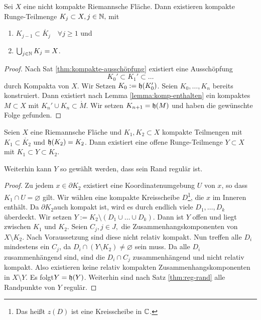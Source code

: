 \begin{cor}
  \label{cor:ausschöpfung-kompakt}
  Sei $X$ eine nicht kompakte Riemannsche Fläche. Dann existieren
  kompakte Runge-Teilmenge $K_j \subset X, j \in \mathbb{N},$ mit
  \begin{enumerate}
  \item $K_{j-1} \subset \mathring{K_j} \quad \forall j \geq 1$ und
  \item $\bigcup_{j\in \mathbb{N}} K_j = X$.
  \end{enumerate}
\end{cor}

\begin{proof}
  Nach Sat \ref{thm:kompakte-ausschöpfung} existiert eine 
  Ausschöpfung
  \[
  K_0' \subset K_1' \subset \dots
  \]
  durch Kompakta von $X$. Wir Setzen $K_0 := \mathfrak{h}(K_0')$. Seien
  $K_0, \dots, K_n$ bereits konstruiert. Dann existiert nach Lemma
  \ref{lemma:komp-enthalten} ein
  kompaktes $M \subset X$ mit $K_n' \cup K_n \subset \mathring
  M$. Wir setzen $K_{n+1} = \mathfrak{h}(M)$ und haben die gewünschte Folge
  gefunden.
\end{proof}

\begin{lemma}
  \label{lemma:zwischen-runge}
  Seien $X$ eine Riemannsche Fläche und $K_1, K_2 \subset X$ kompakte
  Teilmengen mit $K_1 \subset \mathring{K_2}$ und $\mathfrak{h}(K_2) =
  K_2$. Dann existiert eine offene Runge-Teilmenge $Y \subset X$ mit
  $K_1 \subset Y \subset K_2$.

  Weiterhin kann $Y$ so gewählt werden, dass sein Rand regulär ist.
\end{lemma}

\begin{proof}
  Zu jedem $x \in \partial K_2$ existiert eine Koordinatenumgebung $U$
  von $x$, so dass $K_1 \cap U = \varnothing$ gilt. Wir wählen eine kompakte
  Kreisscheibe $D$\footnote{Das heißt $z(D)$ ist eine Kreisscheibe in
    $\mathbb{C}$.}, die $x$ im Inneren enthält. Da $\partial K_2$auch
  kompakt ist, wird es durch endlich viele $D_1, \dots, D_k$
  überdeckt. Wir setzen $Y := K_2 \setminus (D_1 \cup \dots \cup D_k)$. 
  Dann ist $Y$ offen und liegt zwischen $K_1$ und $K_2$. 
  Seien $C_j, j \in J,$ die Zusammenhangskomponenten von $X \setminus
  K_2$. Nach Voraussetzung sind diese nicht relativ kompakt. Nun
  treffen alle $D_i$ mindestens ein $C_j$, da $D_i \cap (Y \setminus
  K_2) \neq \varnothing$ sein muss. Da alle $D_i$ zusammenhängend
  sind, sind die $D_i \cap C_j$ zusammenhängend und nicht relativ
  kompakt. Also existieren keine relativ kompakten
  Zusammenhangskomponenten in $X\setminus Y$. Es folgt$Y = \mathfrak{h}(Y)$.
  Weiterhin sind nach Satz \ref{thm:reg-rand} alle Randpunkte von $Y$ regulär.
\end{proof}


